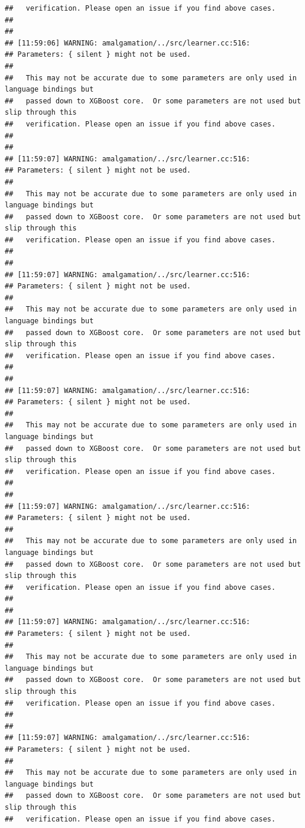 \documentclass[AMS,STIX2COL]{WileyNJD-v2}\usepackage[]{graphicx}\usepackage[]{color}
\makeatletter
\newenvironment{kframe}{%
 \def\at@end@of@kframe{}%
 \ifinner\ifhmode%
  \def\at@end@of@kframe{\end{minipage}}%
  \begin{minipage}{\columnwidth}%
 \fi\fi%
 \def\FrameCommand##1{\hskip\@totalleftmargin \hskip-\fboxsep
 \colorbox{shadecolor}{##1}\hskip-\fboxsep
     \hskip-\linewidth \hskip-\@totalleftmargin \hskip\columnwidth}%
 \MakeFramed {\advance\hsize-\width
   \@totalleftmargin\z@ \linewidth\hsize
   \@setminipage}}%
 {\par\unskip\endMakeFramed%
 \at@end@of@kframe}
\newenvironment{knitrout}{}{} %
\makeatother
\begin{document}
\begin{knitrout}
\begin{kframe}
\begin{verbatim}
##   verification. Please open an issue if you find above cases.
## 
## 
## [11:59:06] WARNING: amalgamation/../src/learner.cc:516: 
## Parameters: { silent } might not be used.
## 
##   This may not be accurate due to some parameters are only used in language bindings but
##   passed down to XGBoost core.  Or some parameters are not used but slip through this
##   verification. Please open an issue if you find above cases.
## 
## 
## [11:59:07] WARNING: amalgamation/../src/learner.cc:516: 
## Parameters: { silent } might not be used.
## 
##   This may not be accurate due to some parameters are only used in language bindings but
##   passed down to XGBoost core.  Or some parameters are not used but slip through this
##   verification. Please open an issue if you find above cases.
## 
## 
## [11:59:07] WARNING: amalgamation/../src/learner.cc:516: 
## Parameters: { silent } might not be used.
## 
##   This may not be accurate due to some parameters are only used in language bindings but
##   passed down to XGBoost core.  Or some parameters are not used but slip through this
##   verification. Please open an issue if you find above cases.
## 
## 
## [11:59:07] WARNING: amalgamation/../src/learner.cc:516: 
## Parameters: { silent } might not be used.
## 
##   This may not be accurate due to some parameters are only used in language bindings but
##   passed down to XGBoost core.  Or some parameters are not used but slip through this
##   verification. Please open an issue if you find above cases.
## 
## 
## [11:59:07] WARNING: amalgamation/../src/learner.cc:516: 
## Parameters: { silent } might not be used.
## 
##   This may not be accurate due to some parameters are only used in language bindings but
##   passed down to XGBoost core.  Or some parameters are not used but slip through this
##   verification. Please open an issue if you find above cases.
## 
## 
## [11:59:07] WARNING: amalgamation/../src/learner.cc:516: 
## Parameters: { silent } might not be used.
## 
##   This may not be accurate due to some parameters are only used in language bindings but
##   passed down to XGBoost core.  Or some parameters are not used but slip through this
##   verification. Please open an issue if you find above cases.
## 
## 
## [11:59:07] WARNING: amalgamation/../src/learner.cc:516: 
## Parameters: { silent } might not be used.
## 
##   This may not be accurate due to some parameters are only used in language bindings but
##   passed down to XGBoost core.  Or some parameters are not used but slip through this
##   verification. Please open an issue if you find above cases.

\end{verbatim}
\end{kframe}
\end{knitrout}
\end{document}
